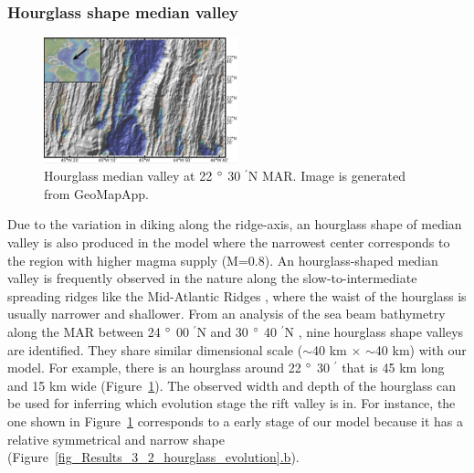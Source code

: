 \subsubsection{Hourglass shape median valley}

\begin{figure}[h]
  \centering
    \includegraphics[width=0.5\textwidth]{./Figures/fig_Discussion_Observation_4_hourglass_22N_MAR.eps}
  \caption[Hourglass median valley at 22 $\degree$ 30 $^{\prime}$N MAR.]{Hourglass median valley at 22 $\degree$ 30 $^{\prime}$N MAR. Image is generated from GeoMapApp.}
 \label{fig_Discussion_Observation_4_hourglass_22N_MAR}
\end{figure}   

Due to the variation in diking along the ridge-axis, an hourglass shape of median valley is also produced in the model where the narrowest center corresponds to the region with higher magma supply (M=$0.8$). An hourglass-shaped median valley is frequently observed in the nature along the slow-to-intermediate spreading ridges like the Mid-Atlantic Ridges \citep{Sempere1993}, where the waist of the hourglass is usually narrower and shallower. From an analysis of the sea beam bathymetry along the MAR between 24 $\degree$ 00 $^{\prime}$N and 30 $\degree$ 40 $^{\prime}$N \citep{Sempere1993}, nine hourglass shape valleys are identified. They share similar dimensional scale ($\sim$40 km $\times$ $\sim$40 km) with our model. For example, there is an hourglass around 22 $\degree$ 30 $^{\prime}$ that is 45 km long and 15 km wide (Figure~\hyperref[fig_Discussion_Observation_4_hourglass_22N_MAR]{\ref{fig_Discussion_Observation_4_hourglass_22N_MAR}}). The observed width and depth of the hourglass can be used for inferring which evolution stage the rift valley is in. For instance, the one shown in Figure~\hyperref[fig_Discussion_Observation_4_hourglass_22N_MAR]{\ref{fig_Discussion_Observation_4_hourglass_22N_MAR}} corresponds to a early stage of our model because it has a relative symmetrical and narrow shape (Figure~\hyperref[fig_Results_3_2_hourglass_evolution]{\ref{fig_Results_3_2_hourglass_evolution}.b}). 

